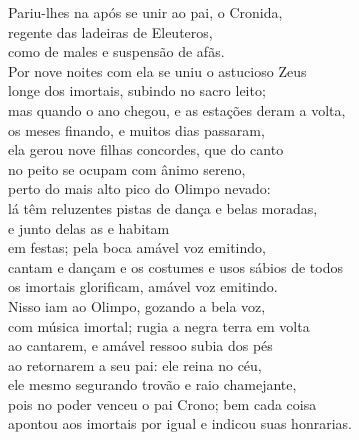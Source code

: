 \begin{pages}
\begin{Rightside}
\quad{}Pariu-lhes na  após se unir ao pai, o Cronida,\\
 regente das ladeiras de Eleuteros,\\
como  de males e suspensão de afãs. \\
Por nove noites com ela se uniu o astucioso Zeus\\
longe dos imortais, subindo no sacro leito;\\
mas quando o ano chegou, e as estações deram a volta,\\
os meses finando, e muitos dias passaram,\\
ela gerou nove filhas concordes, que do canto \\
no peito se ocupam com ânimo sereno,\\
perto do mais alto pico do Olimpo nevado:\\
lá têm reluzentes pistas de dança e belas moradas,\\
e junto delas as  e  habitam\\
em festas; pela boca amável voz emitindo, \\
cantam e dançam e os costumes e usos sábios de todos\\
os imortais glorificam, amável voz emitindo.\\
Nisso iam ao Olimpo, gozando a bela voz,\\
com música imortal; rugia a negra terra em volta\\
ao cantarem, e amável ressoo subia dos pés \\
ao retornarem a seu pai: ele reina no céu,\\
ele mesmo segurando trovão e raio chamejante,\\
pois no poder venceu o pai Crono; bem cada coisa\\
apontou aos imortais por igual e indicou suas honrarias.\\


\end{Rightside}
\end{pages}
